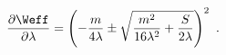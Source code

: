 \begin{equation}
\label{eq:qcdkonishi3}
\frac{\partial \Weff}{\partial \lambda}=\left(-\frac{m}{4\lambda} \pm 
\sqrt{\frac{m^2}{16 \lambda^2}+\frac{S}{2\lambda}}\right)^2 ~.
\end{equation}

